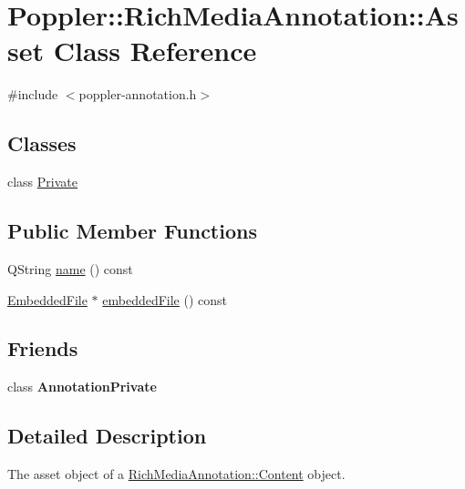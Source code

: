 \hypertarget{class_poppler_1_1_rich_media_annotation_1_1_asset}{}\section{Poppler\+:\+:Rich\+Media\+Annotation\+:\+:Asset Class Reference}
\label{class_poppler_1_1_rich_media_annotation_1_1_asset}


{\ttfamily \#include $<$poppler-\/annotation.\+h$>$}

\subsection*{Classes}
\begin{DoxyCompactItemize}
\item 
class \hyperlink{class_poppler_1_1_rich_media_annotation_1_1_asset_1_1_private}{Private}
\end{DoxyCompactItemize}
\subsection*{Public Member Functions}
\begin{DoxyCompactItemize}
\item 
Q\+String \hyperlink{class_poppler_1_1_rich_media_annotation_1_1_asset_adfda5df2f7cc6ec814d6bd7b4a12d9f3}{name} () const
\item 
\hyperlink{class_poppler_1_1_embedded_file}{Embedded\+File} $\ast$ \hyperlink{class_poppler_1_1_rich_media_annotation_1_1_asset_acac8bbfce1f90da91f7655e5eb1799d8}{embedded\+File} () const
\end{DoxyCompactItemize}
\subsection*{Friends}
\begin{DoxyCompactItemize}
\item 
\mbox{\label{class_poppler_1_1_rich_media_annotation_1_1_asset_add0bc3e32e560f9e9eb3025587c1ad54}} 
class {\bfseries Annotation\+Private}
\end{DoxyCompactItemize}


\subsection{Detailed Description}
The asset object of a \hyperlink{class_poppler_1_1_rich_media_annotation_1_1_content}{Rich\+Media\+Annotation\+::\+Content} object.


